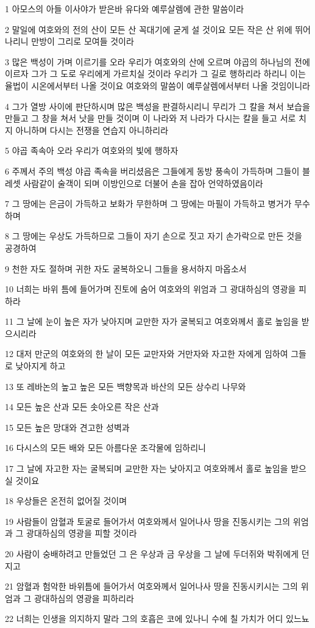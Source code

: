 \par 1 아모스의 아들 이사야가 받은바 유다와 예루살렘에 관한 말씀이라
\par 2 말일에 여호와의 전의 산이 모든 산 꼭대기에 굳게 설 것이요 모든 작은 산 위에 뛰어나리니 만방이 그리로 모여들 것이라
\par 3 많은 백성이 가며 이르기를 오라 우리가 여호와의 산에 오르며 야곱의 하나님의 전에 이르자 그가 그 도로 우리에게 가르치실 것이라 우리가 그 길로 행하리라 하리니 이는 율법이 시온에서부터 나올 것이요 여호와의 말씀이 예루살렘에서부터 나올 것임이니라
\par 4 그가 열방 사이에 판단하시며 많은 백성을 판결하시리니 무리가 그 칼을 쳐서 보습을 만들고 그 창을 쳐서 낫을 만들 것이며 이 나라와 저 나라가 다시는 칼을 들고 서로 치지 아니하며 다시는 전쟁을 연습지 아니하리라
\par 5 야곱 족속아 오라 우리가 여호와의 빛에 행하자
\par 6 주께서 주의 백성 야곱 족속을 버리셨음은 그들에게 동방 풍속이 가득하며 그들이 블레셋 사람같이 술객이 되며 이방인으로 더불어 손을 잡아 언약하였음이라
\par 7 그 땅에는 은금이 가득하고 보화가 무한하며 그 땅에는 마필이 가득하고 병거가 무수하며
\par 8 그 땅에는 우상도 가득하므로 그들이 자기 손으로 짓고 자기 손가락으로 만든 것을 공경하여
\par 9 천한 자도 절하며 귀한 자도 굴복하오니 그들을 용서하지 마옵소서
\par 10 너희는 바위 틈에 들어가며 진토에 숨어 여호와의 위엄과 그 광대하심의 영광을 피하라
\par 11 그 날에 눈이 높은 자가 낮아지며 교만한 자가 굴복되고 여호와께서 홀로 높임을 받으시리라
\par 12 대저 만군의 여호와의 한 날이 모든 교만자와 거만자와 자고한 자에게 임하여 그들로 낮아지게 하고
\par 13 또 레바논의 높고 높은 모든 백향목과 바산의 모든 상수리 나무와
\par 14 모든 높은 산과 모든 솟아오른 작은 산과
\par 15 모든 높은 망대와 견고한 성벽과
\par 16 다시스의 모든 배와 모든 아름다운 조각물에 임하리니
\par 17 그 날에 자고한 자는 굴복되며 교만한 자는 낮아지고 여호와께서 홀로 높임을 받으실 것이요
\par 18 우상들은 온전히 없어질 것이며
\par 19 사람들이 암혈과 토굴로 들어가서 여호와께서 일어나사 땅을 진동시키는 그의 위엄과 그 광대하심의 영광을 피할 것이라
\par 20 사람이 숭배하려고 만들었던 그 은 우상과 금 우상을 그 날에 두더쥐와 박쥐에게 던지고
\par 21 암혈과 험악한 바위틈에 들어가서 여호와께서 일어나사 땅을 진동시키시는 그의 위엄과 그 광대하심의 영광을 피하리라
\par 22 너희는 인생을 의지하지 말라 그의 호흡은 코에 있나니 수에 칠 가치가 어디 있느뇨

